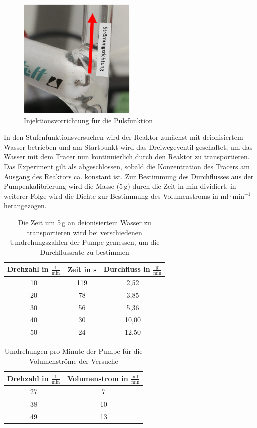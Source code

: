 \documentclass[12pt,liststotoc]{report}
\begin{document}
\begin{figure}[H]
\centering
\includegraphics[width=0.5\textwidth]{Graphics/Injektionsvorrichtung.PNG}
\caption{Injektionsvorrichtung für die Pulsfunktion}
\label{Injektionsvorrichtung}
\end{figure}
\noindent
In den Stufenfunktionsversuchen wird der Reaktor zunächst mit deionisiertem Wasser betrieben und am Startpunkt wird das Dreiwegeventil geschaltet, um das Wasser mit dem Tracer nun kontinuierlich durch den Reaktor zu transportieren. Das Experiment gilt als abgeschlossen, sobald die Konzentration des Tracers am Ausgang des Reaktors ca. konstant ist. Zur Bestimmung des Durchflusses aus der Pumpenkalibrierung wird die Masse (5\,g) durch die Zeit in min dividiert, in weiterer Folge wird die Dichte zur Bestimmung des Volumenstroms in $\text{ml}\cdot\text{min}^{-1}$ herangezogen. 

\begin{table}[H]
\centering
\caption[Pumpenkalibration]{Die Zeit um 5\,g an deionisiertem Wasser zu transportieren wird bei verschiedenen Umdrehungszahlen der Pumpe gemessen, um die Durchflussrate zu bestimmen}
\begin{tabular}{ccc}
\toprule 
Drehzahl in $\frac{1}{\text{min}}$ & Zeit in s & Durchfluss in $\frac{\text{g}}{\text{min}}$\\
\midrule
10 & 119 & 2,52\\
20 & 78 & 3,85 \\
30 & 56 & 5,36 \\
40 & 30 & 10,00 \\
50 & 24 & 12,50 \\
\bottomrule
\end{tabular}
\label{tab:Pumpenkalibration}
\end{table}
\noindent

\begin{table}[H]
\centering
\caption{Umdrehungen pro Minute der Pumpe für die Volumenströme der Versuche}
\begin{tabular}{cc}
\toprule 
Drehzahl in $\frac{1}{\text{min}}$ & Volumenstrom in $\frac{\text{ml}}{\text{min}}$\\
\midrule
27 & 7 \\
38 & 10 \\
49 & 13 \\
\bottomrule
\end{tabular}
\label{tab:Volumenströme}
\end{table}
\noindent
\end{document}
